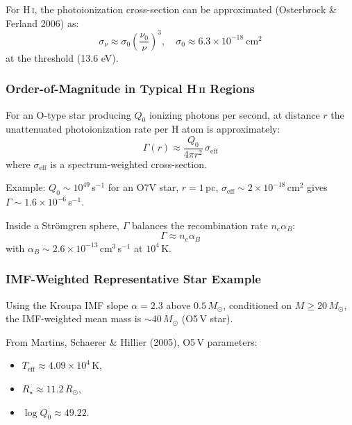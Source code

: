 \documentclass[paper=a4,fontsize=11pt]{scrartcl}
\numberwithin{equation}{section}		%
\numberwithin{figure}{section}			%
\numberwithin{table}{section}				%
\begin{document}
For H\,\textsc{i}, the photoionization cross-section can be approximated (Osterbrock \& Ferland 2006) as:
\begin{equation}
\sigma_\nu \approx \sigma_0 \left( \frac{\nu_0}{\nu} \right)^3, \quad
\sigma_0 \approx 6.3\times 10^{-18}\ \mathrm{cm}^2
\end{equation}
at the threshold (13.6 eV).

\subsubsection{Order-of-Magnitude in Typical H\,\textsc{ii} Regions}
For an O-type star producing $Q_0$ ionizing photons per second, at distance $r$ the unattenuated photoionization rate per H atom is approximately:
\begin{equation}
\Gamma(r) \approx \frac{Q_0}{4\pi r^2} \, \sigma_{\mathrm{eff}}
\end{equation}
where $\sigma_{\mathrm{eff}}$ is a spectrum-weighted cross-section.

Example: $Q_0 \sim 10^{49}$\,s$^{-1}$ for an O7V star, $r=1$\,pc, $\sigma_{\mathrm{eff}} \sim 2\times 10^{-18}$\,cm$^2$ gives $\Gamma \sim 1.6\times 10^{-6}$\,s$^{-1}$.

Inside a Strömgren sphere, $\Gamma$ balances the recombination rate $n_e \alpha_B$:
\begin{equation}
\Gamma \approx n_e \alpha_B
\end{equation}
with $\alpha_B \sim 2.6\times 10^{-13}$\,cm$^3$\,s$^{-1}$ at $10^4$\,K.

\subsubsection{IMF-Weighted Representative Star Example}

Using the Kroupa IMF slope $\alpha=2.3$ above $0.5\,M_\odot$, conditioned on $M\ge 20\,M_\odot$, the IMF-weighted mean mass is $\sim 40\,M_\odot$ (O5\,V star).

From Martins, Schaerer \& Hillier (2005), O5\,V parameters:
\begin{itemize}
    \item $T_{\mathrm{eff}} \approx 4.09\times 10^4$\,K,
    \item $R_\star \approx 11.2\,R_\odot$,
    \item $\log Q_0 \approx 49.22$.
\end{itemize}
\end{document}
